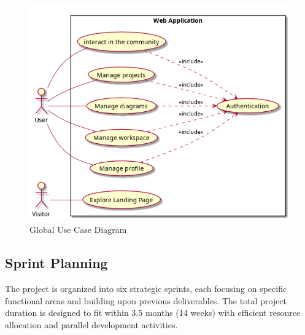 \begin{figure}[H]
    \centering
    \includegraphics[width=\textwidth]{./conception/global_use_case_diagram.png}
    \caption{Global Use Case Diagram}
    \label{fig:global_use_case}
\end{figure}


\subsection{Sprint Planning}

The project is organized into six strategic sprints, each focusing on specific functional areas and building upon previous deliverables. The total project duration is designed to fit within 3.5 months (14 weeks) with efficient resource allocation and parallel development activities.

